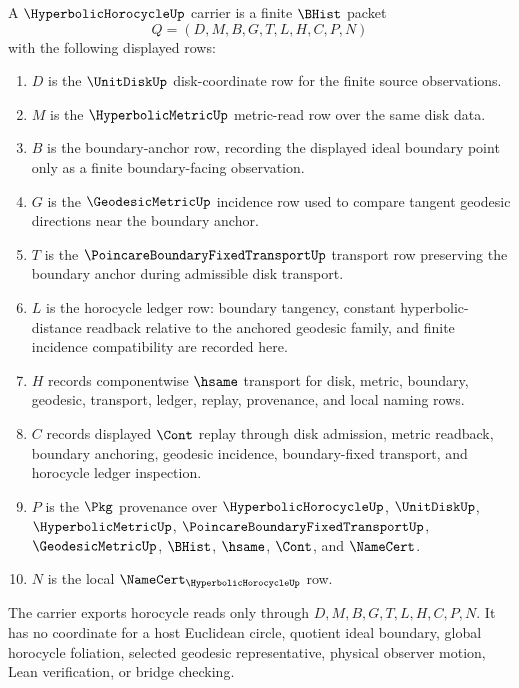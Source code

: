 \begin{definition}
\label{def:hyperbolic-horocycle-carrier}
A $\HyperbolicHorocycleUp$ carrier is a finite $\BHist$ packet
$$
Q=(D,M,B,G,T,L,H,C,P,N)
$$
with the following displayed rows:
\begin{enumerate}
\item $D$ is the $\UnitDiskUp$ disk-coordinate row for the finite source observations.
\item $M$ is the $\HyperbolicMetricUp$ metric-read row over the same disk data.
\item $B$ is the boundary-anchor row, recording the displayed ideal boundary point only as a finite boundary-facing observation.
\item $G$ is the $\GeodesicMetricUp$ incidence row used to compare tangent geodesic directions near the boundary anchor.
\item $T$ is the $\PoincareBoundaryFixedTransportUp$ transport row preserving the boundary anchor during admissible disk transport.
\item $L$ is the horocycle ledger row: boundary tangency, constant hyperbolic-distance readback relative to the anchored geodesic family, and finite incidence compatibility are recorded here.
\item $H$ records componentwise $\hsame$ transport for disk, metric, boundary, geodesic, transport, ledger, replay, provenance, and local naming rows.
\item $C$ records displayed $\Cont$ replay through disk admission, metric readback, boundary anchoring, geodesic incidence, boundary-fixed transport, and horocycle ledger inspection.
\item $P$ is the $\Pkg$ provenance over $\HyperbolicHorocycleUp$, $\UnitDiskUp$, $\HyperbolicMetricUp$, $\PoincareBoundaryFixedTransportUp$, $\GeodesicMetricUp$, $\BHist$, $\hsame$, $\Cont$, and $\NameCert$.
\item $N$ is the local $\NameCert_{\HyperbolicHorocycleUp}$ row.
\end{enumerate}
The carrier exports horocycle reads only through $D,M,B,G,T,L,H,C,P,N$. It has no coordinate for a host Euclidean circle, quotient ideal boundary, global horocycle foliation, selected geodesic representative, physical observer motion, Lean verification, or bridge checking.
\end{definition}

